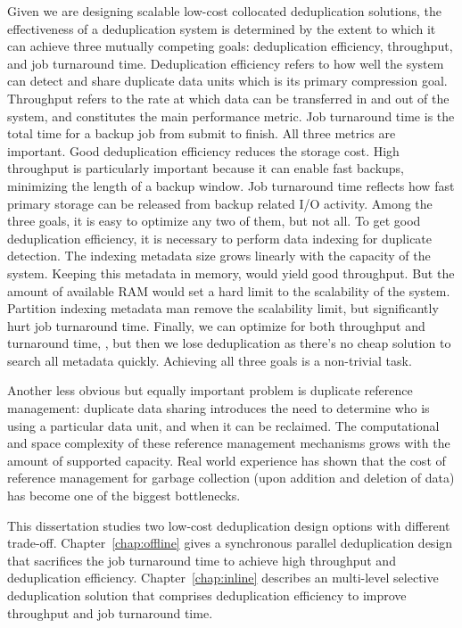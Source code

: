 Given we are designing scalable low-cost collocated deduplication solutions,
the effectiveness of a deduplication system is determined 
by the extent to which it can achieve three mutually competing goals: 
deduplication efficiency, throughput, and job turnaround time. 
Deduplication efficiency refers to
how well the system can detect and share duplicate data
units which is its primary compression goal. Throughput refers
to the rate at which data can be transferred in and out of
the system, and constitutes the main performance metric.
Job turnaround time is the total time for a backup job from submit to finish.
All three metrics are important. Good deduplication efficiency 
reduces the storage cost. High throughput
is particularly important because it can enable fast backups, 
minimizing the length of a backup window. 
Job turnaround time reflects how fast primary storage 
can be released from backup related I/O activity.
Among the three goals, it is easy to optimize any two of them,
but not all. To get good deduplication efficiency, 
it is necessary to perform data indexing for duplicate detection.
The indexing metadata size grows linearly with the capacity of the system. 
Keeping this metadata in memory,
would yield good throughput. 
But the amount of available RAM would set a hard limit to the scalability of the
system. Partition indexing metadata man remove
the scalability limit, but significantly hurt job turnaround time.
Finally, we can optimize for both throughput and turnaround time, 
, but then we lose deduplication as there's no cheap solution to search all metadata quickly. 
Achieving all three goals is a non-trivial task.

Another less obvious but equally important problem is
duplicate reference management: duplicate data sharing
introduces the need to determine who is using a particular data unit, and when it can be reclaimed. 
The computational and space complexity of these reference management mechanisms grows 
with the amount of supported capacity. Real world experience has shown that the
cost of reference management for garbage collection (upon addition and deletion of data) 
has become one of the biggest 
bottlenecks.

This dissertation studies two low-cost deduplication design options with different trade-off. 
Chapter~\ref{chap:offline} gives a synchronous parallel deduplication design that
sacrifices the job turnaround time to achieve high throughput and deduplication efficiency.
Chapter~\ref{chap:inline} describes an multi-level selective deduplication solution
that comprises deduplication efficiency to improve throughput and job turnaround time.

